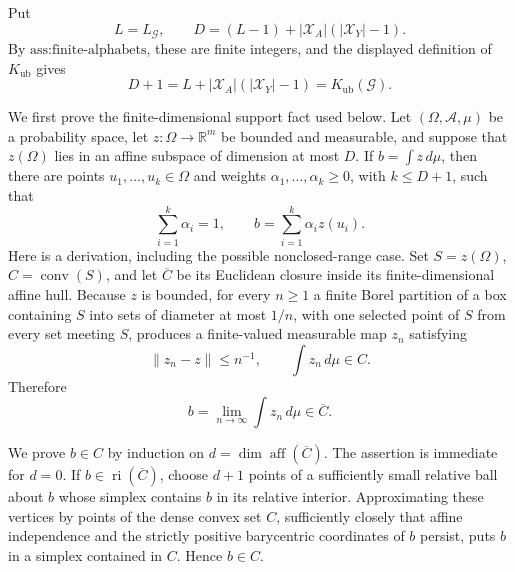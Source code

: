 Put
\[
L=L_{\mathcal G},
\qquad
D=(L-1)+|\mathcal X_A|(|\mathcal X_Y|-1).
\tag{1}
\]
By \(\text{ass:finite-alphabets}\), these are finite integers, and the displayed definition of \(K_{\mathrm{ub}}\) gives
\[
D+1=L+|\mathcal X_A|(|\mathcal X_Y|-1)
=K_{\mathrm{ub}}(\mathcal G).
\tag{2}
\]

We first prove the finite-dimensional support fact used below. Let \((\Omega,\mathcal A,\mu)\) be a probability space, let \(z:\Omega\to\mathbb R^m\) be bounded and measurable, and suppose that \(z(\Omega)\) lies in an affine subspace of dimension at most \(D\). If \(b=\int z\,d\mu\), then there are points \(u_1,\ldots,u_k\in\Omega\) and weights \(\alpha_1,\ldots,\alpha_k\geq0\), with \(k\leq D+1\), such that
\[
\sum_{i=1}^k\alpha_i=1,
\qquad
b=\sum_{i=1}^k\alpha_i z(u_i).
\tag{3}
\]
Here is a derivation, including the possible nonclosed-range case. Set \(S=z(\Omega)\), \(C=\operatorname{conv}(S)\), and let \(\overline C\) be its Euclidean closure inside its finite-dimensional affine hull. Because \(z\) is bounded, for every \(n\geq1\) a finite Borel partition of a box containing \(S\) into sets of diameter at most \(1/n\), with one selected point of \(S\) from every set meeting \(S\), produces a finite-valued measurable map \(z_n\) satisfying
\[
\|z_n-z\|\leq n^{-1},
\qquad
\int z_n\,d\mu\in C.
\]
Therefore
\[
b=\lim_{n\to\infty}\int z_n\,d\mu\in\overline C.
\tag{4}
\]

We prove \(b\in C\) by induction on \(d=\dim\operatorname{aff}(\overline C)\). The assertion is immediate for \(d=0\). If \(b\in\operatorname{ri}(\overline C)\), choose \(d+1\) points of a sufficiently small relative ball about \(b\) whose simplex contains \(b\) in its relative interior. Approximating these vertices by points of the dense convex set \(C\), sufficiently closely that affine independence and the strictly positive barycentric coordinates of \(b\) persist, puts \(b\) in a simplex contained in \(C\). Hence \(b\in C\).


